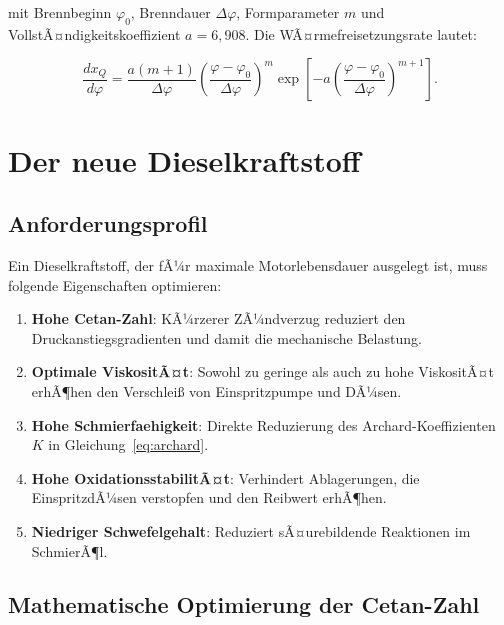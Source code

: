 ﻿\documentclass[12pt,a4paper]{article}
\begin{document}
mit Brennbeginn $\varphi_0$, Brenndauer $\Delta\varphi$, Formparameter $m$
und VollstÃ¤ndigkeitskoeffizient $a = 6{,}908$. Die
WÃ¤rmefreisetzungsrate lautet:

\begin{equation}
  \frac{dx_Q}{d\varphi} = \frac{a(m+1)}{\Delta\varphi}
  \left(\frac{\varphi-\varphi_0}{\Delta\varphi}\right)^m
  \exp\!\left[-a\left(\frac{\varphi-\varphi_0}{\Delta\varphi}\right)^{m+1}\right].
  \label{eq:wiebe_dxQ}
\end{equation}

\section{Der neue Dieselkraftstoff}
\label{sec:kraftstoff}

\subsection{Anforderungsprofil}
\label{sec:kraftstoff_anforderungen}

Ein Dieselkraftstoff, der fÃ¼r maximale Motorlebensdauer ausgelegt ist,
muss folgende Eigenschaften optimieren:

\begin{enumerate}[label=(\alph*)]
  \item \textbf{Hohe Cetan-Zahl}: KÃ¼rzerer ZÃ¼ndverzug reduziert den
        Druckanstiegsgradienten und damit die mechanische Belastung.
  \item \textbf{Optimale ViskositÃ¤t}: Sowohl zu geringe als auch zu hohe
        ViskositÃ¤t erhÃ¶hen den Verschlei\ss{} von Einspritzpumpe und DÃ¼sen.
  \item \textbf{Hohe Schmierfaehigkeit}: Direkte Reduzierung des
        Archard-Koeffizienten~$K$ in Gleichung~\eqref{eq:archard}.
  \item \textbf{Hohe OxidationsstabilitÃ¤t}: Verhindert Ablagerungen,
        die EinspritzdÃ¼sen verstopfen und den Reibwert erhÃ¶hen.
  \item \textbf{Niedriger Schwefelgehalt}: Reduziert sÃ¤urebildende
        Reaktionen im SchmierÃ¶l.
\end{enumerate}

\subsection{Mathematische Optimierung der Cetan-Zahl}
\label{sec:kraftstoff_cetan}
\end{document}
